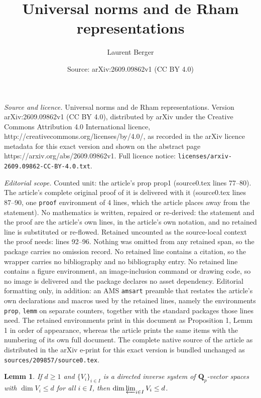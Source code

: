 \documentclass[10pt,a4paper]{amsart}
\title{Universal norms and de Rham representations}
\author{Laurent Berger}
\date{Source: arXiv:2609.09862v1 (CC BY 4.0)}
\newtheorem{lemm}{Lemm}
\newcommand{\Qp}{\mathbf{Q}_p}
\renewcommand{\projlim}{\varprojlim}
\begin{document}
\maketitle

\noindent\emph{Source and licence.} Universal norms and de Rham representations. Version arXiv:2609.09862v1 (CC BY 4.0), distributed by arXiv under the Creative Commons Attribution 4.0 International licence, http://creativecommons.org/licenses/by/4.0/, as recorded in the arXiv licence metadata for this exact version and shown on the abstract page https://arxiv.org/abs/2609.09862v1. Full licence notice: \texttt{licenses/arxiv-2609.09862-CC-BY-4.0.txt}.\par\smallskip

\noindent\textit{Editorial scope.} Counted unit: the article's prop prop1 (source0.tex lines 77--80). The article's complete original proof of it is delivered with it (source0.tex lines 87--90, one \texttt{proof} environment of 4 lines, which the article places away from the statement). No mathematics is written, repaired or re-derived: the statement and the proof are the article's own lines, in the article's own notation, and no retained line is substituted or re-flowed.  Retained uncounted as the source-local context the proof needs: lines 92--96.  Nothing was omitted from any retained span, so the package carries no omission record.  No retained line contains a citation, so the wrapper carries no bibliography and no bibliography entry.  No retained line contains a figure environment, an image-inclusion command or drawing code, so no image is delivered and the package declares no asset dependency.  Editorial formatting only, in addition: an AMS \texttt{amsart} preamble that restates the article's own declarations and macros used by the retained lines, namely the environments \texttt{prop}, \texttt{lemm} on separate counters, together with the standard packages those lines need.  The retained environments print in this document as Proposition 1, Lemm 1 in order of appearance, whereas the article prints the same items with the numbering of its own full document.  The complete native source of the article as distributed in the arXiv e-print for this exact version is bundled unchanged as \texttt{sources/209857/source0.tex}.
\begin{lemm}
\label{lemm1}
If $d \geq 1$ and $\{ V_i \}_{i \in I }$ is a directed inverse system 
of $\Qp$-vector spaces with $\dim V_i \leq d$ for all $i \in I$, then $\dim \projlim_{i \in I} V_i \leq d$.
\end{lemm}
\end{document}
